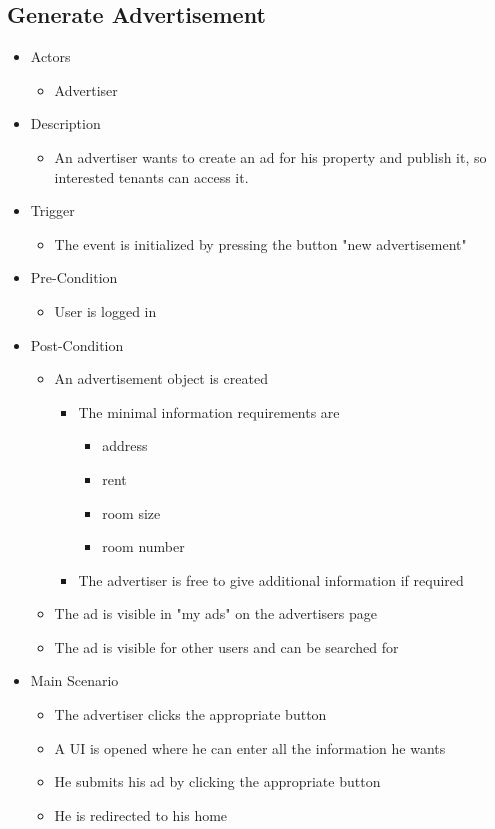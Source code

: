\documentclass[a4paper,11pt]{article}
\begin{document}
\subsection*{Generate Advertisement}
\begin{itemize}
	\item Actors
		\begin{itemize}
			\item Advertiser
		\end{itemize}
	\item Description
		\begin{itemize}
			\item An advertiser wants to create an ad for his property and publish it, so interested tenants can access it.
		\end{itemize}
	\item Trigger
		\begin{itemize}
			\item The event is initialized by pressing the button "new advertisement"
		\end{itemize}
	\item Pre-Condition
		\begin{itemize}
			\item User is logged in
		\end{itemize}
	\item Post-Condition
		\begin{itemize}
			\item An advertisement object is created
				\begin{itemize}
					\item The minimal information requirements are
					\begin{itemize}
						\item address
						\item rent
						\item room size
						\item room number
					\end{itemize}
					\item The advertiser is free to give additional information if required
				\end{itemize}
			\item The ad is visible in "my ads" on the advertisers page
			\item The ad is visible for other users and can be searched for
		\end{itemize}
	\item Main Scenario
		\begin{itemize}
			\item The advertiser clicks the appropriate button
			\item A UI is opened where he can enter all the information he wants
			\item He submits his ad by clicking the appropriate button
			\item He is redirected to his home
		\end{itemize}
\end{itemize}
\end{document}
